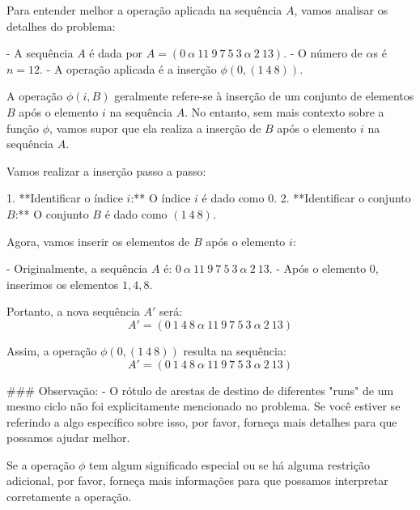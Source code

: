 Para entender melhor a operação aplicada na sequência \( A \), vamos analisar os detalhes do problema:

- A sequência \( A \) é dada por \( A = (0~\alpha~11~9~7~5~3~\alpha~2~13) \).
- O número de \(\alpha\)s é \( n = 12 \).
- A operação aplicada é a inserção \(\phi(0, (1~4~8))\).

A operação \(\phi(i, B)\) geralmente refere-se à inserção de um conjunto de elementos \( B \) após o elemento \( i \) na sequência \( A \). No entanto, sem mais contexto sobre a função \(\phi\), vamos supor que ela realiza a inserção de \( B \) após o elemento \( i \) na sequência \( A \).

Vamos realizar a inserção passo a passo:

1. **Identificar o índice \( i \):** O índice \( i \) é dado como 0.
2. **Identificar o conjunto \( B \):** O conjunto \( B \) é dado como \( (1~4~8) \).

Agora, vamos inserir os elementos de \( B \) após o elemento \( i \):

- Originalmente, a sequência \( A \) é: \( 0~\alpha~11~9~7~5~3~\alpha~2~13 \).
- Após o elemento \( 0 \), inserimos os elementos \( 1, 4, 8 \).

Portanto, a nova sequência \( A' \) será:
\[ A' = (0~1~4~8~\alpha~11~9~7~5~3~\alpha~2~13) \]

Assim, a operação \(\phi(0, (1~4~8))\) resulta na sequência:
\[ A' = (0~1~4~8~\alpha~11~9~7~5~3~\alpha~2~13) \]

### Observação:
- O rótulo de arestas de destino de diferentes "runs" de um mesmo ciclo não foi explicitamente mencionado no problema. Se você estiver se referindo a algo específico sobre isso, por favor, forneça mais detalhes para que possamos ajudar melhor.

Se a operação \(\phi\) tem algum significado especial ou se há alguma restrição adicional, por favor, forneça mais informações para que possamos interpretar corretamente a operação.